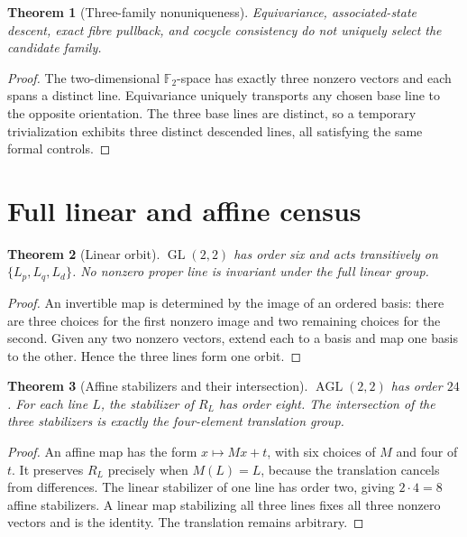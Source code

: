 \documentclass[11pt]{article}
\newtheorem{theorem}{Theorem}
\newcommand{\Ftwo}{\mathbb F_2}
\begin{document}
\begin{theorem}[Three-family nonuniqueness]
Equivariance, associated-state descent, exact fibre pullback, and cocycle
consistency do not uniquely select the candidate family.
\end{theorem}
\begin{proof}
The two-dimensional \(\Ftwo\)-space has exactly three nonzero vectors and each
spans a distinct line. Equivariance uniquely transports any chosen base line
to the opposite orientation. The three base lines are distinct, so a
temporary trivialization exhibits three distinct descended lines, all
satisfying the same formal controls.
\end{proof}

\section{Full linear and affine census}

\begin{theorem}[Linear orbit]
\(\operatorname{GL}(2,2)\) has order six and acts transitively on
\(\{L_p,L_q,L_d\}\). No nonzero proper line is invariant under the full
linear group.
\end{theorem}
\begin{proof}
An invertible map is determined by the image of an ordered basis: there are
three choices for the first nonzero image and two remaining choices for the
second. Given any two nonzero vectors, extend each to a basis and map one
basis to the other. Hence the three lines form one orbit.
\end{proof}

\begin{theorem}[Affine stabilizers and their intersection]
\(\operatorname{AGL}(2,2)\) has order \(24\). For each line \(L\), the
stabilizer of \(R_L\) has order eight. The intersection of the three
stabilizers is exactly the four-element translation group.
\end{theorem}
\begin{proof}
An affine map has the form \(x\mapsto Mx+t\), with six choices of \(M\) and
four of \(t\). It preserves \(R_L\) precisely when \(M(L)=L\), because the
translation cancels from differences. The linear stabilizer of one line has
order two, giving \(2\cdot4=8\) affine stabilizers. A linear map stabilizing
all three lines fixes all three nonzero vectors and is the identity. The
translation remains arbitrary.
\end{proof}
\end{document}
